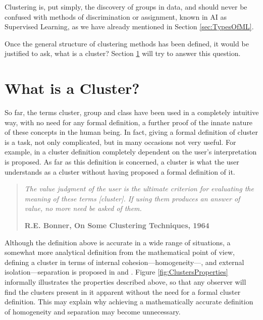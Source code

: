 Clustering is, put simply, the discovery of groups in data, and should never be confused with methods of discrimination or assignment, known in \acs{AI} as Supervised Learning, as we have already mentioned in Section \ref{sec:TypesOfML}. 

Once the general structure of clustering methods has been defined, it would be justified to ask, what is a cluster? Section \ref{sec:WhatIsCluster} will try to answer this question.

\section{What is a Cluster?} \label{sec:WhatIsCluster}

So far, the terms cluster, group and class have been used in a completely intuitive way, with no need for any formal definition, a further proof of the innate nature of these concepts in the human being. In fact, giving a formal definition of cluster is a task, not only complicated, but in many occasions not very useful. For example, in \cite{lance1967general} a cluster definition completely dependent on the user's interpretation is proposed. As far as this definition is concerned, a cluster is what the user understands as a cluster without having proposed a formal definition of it.

\begin{quotation}{\slshape
		The value judgment of the user is the ultimate criterion for evaluating the meaning of these terms [cluster]. If using them produces an answer of value, no more need be asked of them.}
	\begin{flushright}
		\textbf{R.E. Bonner, On Some Clustering Techniques, 1964} 
	\end{flushright}
\end{quotation}

Although the definition above is accurate in a wide range of situations, a somewhat more analytical definition from the mathematical point of view, defining a cluster in terms of internal cohesion---homogeneity---, and external isolation---separation is proposed in \cite{cormack1971review} and \cite{gordon:1999}. Figure \ref{fig:ClustersProperties} informally illustrates the properties described above, so that any observer will find the clusters present in it apparent without the need for a formal cluster definition. This may explain why achieving a mathematically accurate definition of homogeneity and separation may become unnecessary.

